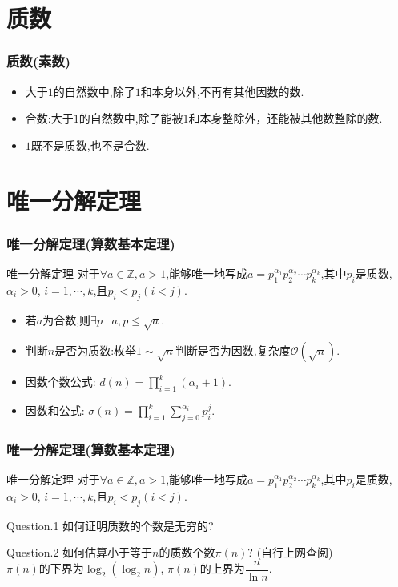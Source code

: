 \documentclass{beamer}
\newcommand{\pau}{}
\begin{document}
\section{质数}
\begin{frame}[fragile]
    \frametitle{质数(素数)}
    \begin{itemize}
        \item 大于$1$的自然数中,除了$1$和本身以外,不再有其他因数的数. \pau
        \item 合数:大于$1$的自然数中,除了能被$1$和本身整除外，还能被其他数整除的数. \pau
        \item $1$既不是质数,也不是合数.
    \end{itemize}
\end{frame}

\section{唯一分解定理}
\begin{frame}[fragile]
    \frametitle{唯一分解定理(算数基本定理)}
    \begin{block}{唯一分解定理}
        对于$\forall a\in\mathbb{Z},a>1$,能够唯一地写成$a=p_1^{\alpha_1}p_2^{\alpha_2}\cdots p_k^{\alpha_k}$,其中$p_i$是质数, $\alpha_i>0$, $i=1,\cdots,k$,且$p_i<p_j\left(i<j\right)$.
    \end{block} \pau
    \begin{itemize}
        \item 若$a$为合数,则$\exists p\mid a,p\leqslant\sqrt{a}$. \pau
        \item 判断$n$是否为质数:枚举$1\sim\sqrt{n}$判断是否为因数,复杂度$\mathcal{O}(\sqrt{n})$. \pau
        \item 因数个数公式: $d(n)=\prod\limits_{i=1}^k(\alpha_i+1)$. \pau
        \item 因数和公式: $\sigma(n)=\prod\limits_{i=1}^k\sum\limits_{j=0}^{\alpha_i}p_i^j$.
    \end{itemize}
\end{frame}

\begin{frame}[fragile]
    \frametitle{唯一分解定理(算数基本定理)}
    \begin{block}{唯一分解定理}
        对于$\forall a\in\mathbb{Z},a>1$,能够唯一地写成$a=p_1^{\alpha_1}p_2^{\alpha_2}\cdots p_k^{\alpha_k}$,其中$p_i$是质数, $\alpha_i>0$, $i=1,\cdots,k$,且$p_i<p_j\left(i<j\right)$.
    \end{block}
    \begin{exampleblock}{Question.1}
        如何证明质数的个数是无穷的?
    \end{exampleblock} \pau
    \begin{exampleblock}{Question.2}
        如何估算小于等于$n$的质数个数$\pi(n)$? (自行上网查阅) \\\pau
        $\pi(n)$的下界为$\log_2(\log_2 n)$, $\pi(n)$的上界为$\dfrac{n}{\ln n}$.
    \end{exampleblock}
\end{frame}
\end{document}
